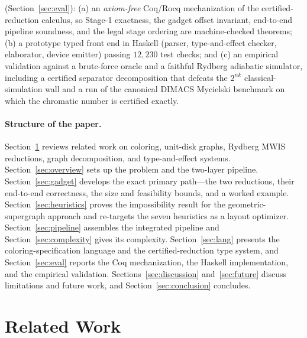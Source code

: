 \documentclass[11pt]{article}
\theoremstyle{definition}
\theoremstyle{remark}
\begin{document}
\begin{enumerate}[label=(\arabic*),leftmargin=2.2em]
        (Section~\ref{sec:eval}): (a) an \emph{axiom-free} Coq/Rocq mechanization
        of the certified-reduction calculus, so Stage-1 exactness, the gadget
        offset invariant, end-to-end pipeline soundness, and the legal stage
        ordering are machine-checked theorems; (b) a prototype typed front end in
        Haskell (parser, type-and-effect checker, elaborator, device emitter)
        passing $12{,}230$ test checks; and (c) an empirical validation against a
        brute-force oracle and a faithful Rydberg adiabatic simulator, including a
        certified separator decomposition that defeats the $2^{nk}$ classical-
        simulation wall and a run of the canonical DIMACS Mycielski benchmark on
        which the chromatic number is certified exactly.
\end{enumerate}

\paragraph{Structure of the paper.} Section~\ref{sec:related} reviews related work
on coloring, unit-disk graphs, Rydberg MWIS reductions, graph decomposition, and
type-and-effect systems. Section~\ref{sec:overview} sets up the problem and the
two-layer pipeline. Section~\ref{sec:gadget} develops the exact primary path---the
two reductions, their end-to-end correctness, the size and feasibility bounds, and a
worked example. Section~\ref{sec:heuristics} proves the impossibility result for the
geometric-supergraph approach and re-targets the seven heuristics as a layout
optimizer. Section~\ref{sec:pipeline} assembles the integrated pipeline and
Section~\ref{sec:complexity} gives its complexity. Section~\ref{sec:lang} presents
the coloring-specification language and the certified-reduction type system, and
Section~\ref{sec:eval} reports the Coq mechanization, the Haskell implementation, and
the empirical validation. Sections~\ref{sec:discussion} and~\ref{sec:future} discuss
limitations and future work, and Section~\ref{sec:conclusion} concludes.

\section{Related Work}
\label{sec:related}
\end{document}
